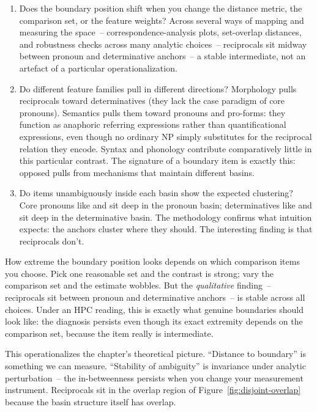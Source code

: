 \begin{enumerate}
\item Does the boundary position shift when you change the distance metric, the comparison set, or the feature weights? Across several ways of mapping and measuring the space~-- correspondence-analysis plots, set-overlap distances, and robustness checks across many analytic choices~-- reciprocals sit midway between pronoun and determinative anchors~-- a stable intermediate, not an artefact of a particular operationalization.

\item Do different feature families pull in different directions? Morphology pulls reciprocals toward determinatives (they lack the case paradigm of core pronouns). Semantics pulls them toward pronouns and pro-forms: they function as anaphoric referring expressions rather than quantificational expressions, even though no ordinary NP simply substitutes for the reciprocal relation they encode. Syntax and phonology contribute comparatively little in this particular contrast. The signature of a boundary item is exactly this: opposed pulls from mechanisms that maintain different basins.
\item Do items unambiguously inside each basin show the expected clustering? Core pronouns like  and  sit deep in the pronoun basin; determinatives like  and  sit deep in the determinative basin. The methodology confirms what intuition expects: the anchors cluster where they should. The interesting finding is that reciprocals don't.
\end{enumerate}

How extreme the boundary position looks depends on which comparison items you choose. Pick one reasonable set and the contrast is strong; vary the comparison set and the estimate wobbles. But the \emph{qualitative} finding~-- reciprocals sit between pronoun and determinative anchors~-- is stable across all choices. Under an HPC reading, this is exactly what genuine boundaries should look like: the diagnosis persists even though its exact extremity depends on the comparison set, because the item really is intermediate.

This operationalizes the chapter's theoretical picture. \enquote{Distance to boundary} is something we can measure. \enquote{Stability of ambiguity} is invariance under analytic perturbation~-- the in-betweenness persists when you change your measurement instrument. Reciprocals sit in the overlap region of Figure~\ref{fig:disjoint-overlap} because the basin structure itself has overlap.

